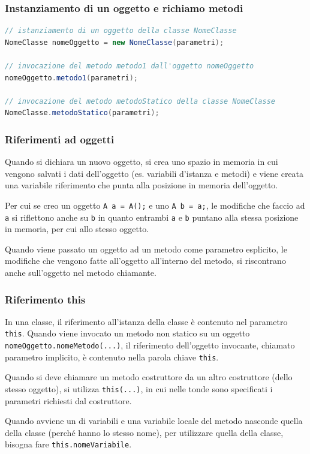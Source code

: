 \documentclass[a4paper]{article}
\begin{document}
\subsubsection*{Instanziamento di un oggetto e richiamo metodi}
\begin{lstlisting}[language=Java]
// istanziamento di un oggetto della classe NomeClasse
NomeClasse nomeOggetto = new NomeClasse(parametri);

// invocazione del metodo metodo1 dall'oggetto nomeOggetto
nomeOggetto.metodo1(parametri);

// invocazione del metodo metodoStatico della classe NomeClasse
NomeClasse.metodoStatico(parametri);
\end{lstlisting}

\subsubsection*{Riferimenti ad oggetti}
Quando si dichiara un nuovo oggetto, si crea uno spazio in memoria in cui vengono salvati i dati dell'oggetto (es. variabili
d'istanza e metodi) e viene creata una variabile riferimento che punta alla posizione in memoria dell'oggetto.

Per cui se creo un oggetto \verb|A a = A();| e uno \verb|A b = a;|, le modifiche che faccio ad \verb|a| si riflettono anche
su \verb|b| in quanto entrambi \verb|a| e \verb|b| puntano alla stessa posizione in memoria, per cui allo stesso oggetto.

Quando viene passato un oggetto ad un metodo come parametro esplicito, le modifiche che vengono fatte all'oggetto all'interno
del metodo, si riscontrano anche sull'oggetto nel metodo chiamante.

\subsubsection*{Riferimento this}
In una classe, il riferimento all'istanza della classe è contenuto nel parametro \verb|this|. Quando viene invocato un metodo
non statico su un oggetto \verb|nomeOggetto.nomeMetodo(...)|, il riferimento dell'oggetto invocante, chiamato parametro implicito, 
è contenuto nella parola chiave \verb|this|.

Quando si deve chiamare un metodo costruttore da un altro costruttore (dello stesso oggetto), si utilizza \verb|this(...)|, in cui
nelle tonde sono specificati i parametri richiesti dal costruttore.

Quando avviene un  di variabili e una variabile locale del metodo nasconde quella della classe (perché hanno lo
stesso nome), per utilizzare quella della classe, bisogna fare \verb|this.nomeVariabile|.
\end{document}
